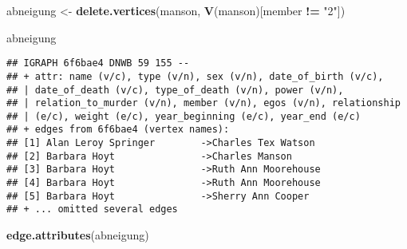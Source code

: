 \documentclass[
]{article}
\newenvironment{Shaded}{\begin{snugshade}}{\end{snugshade}}
\newcommand{\KeywordTok}[1]{\textcolor[rgb]{0.13,0.29,0.53}{\textbf{#1}}}
\newcommand{\NormalTok}[1]{#1}
\newcommand{\OperatorTok}[1]{\textcolor[rgb]{0.81,0.36,0.00}{\textbf{#1}}}
\newcommand{\StringTok}[1]{\textcolor[rgb]{0.31,0.60,0.02}{#1}}
\begin{document}
\begin{Shaded}
\begin{Highlighting}[]
\NormalTok{abneigung <-}\StringTok{ }\KeywordTok{delete.vertices}\NormalTok{(manson, }\KeywordTok{V}\NormalTok{(manson)[member }\OperatorTok{!=}\StringTok{ "2"}\NormalTok{])}

\NormalTok{abneigung}
\end{Highlighting}
\end{Shaded}

\begin{verbatim}
## IGRAPH 6f6bae4 DNWB 59 155 -- 
## + attr: name (v/c), type (v/n), sex (v/n), date_of_birth (v/c),
## | date_of_death (v/c), type_of_death (v/n), power (v/n),
## | relation_to_murder (v/n), member (v/n), egos (v/n), relationship
## | (e/c), weight (e/c), year_beginning (e/c), year_end (e/c)
## + edges from 6f6bae4 (vertex names):
## [1] Alan Leroy Springer        ->Charles Tex Watson 
## [2] Barbara Hoyt               ->Charles Manson     
## [3] Barbara Hoyt               ->Ruth Ann Moorehouse
## [4] Barbara Hoyt               ->Ruth Ann Moorehouse
## [5] Barbara Hoyt               ->Sherry Ann Cooper  
## + ... omitted several edges
\end{verbatim}

\begin{Shaded}
\begin{Highlighting}[]
\KeywordTok{edge.attributes}\NormalTok{(abneigung)}
\end{Highlighting}
\end{Shaded}
\end{document}
